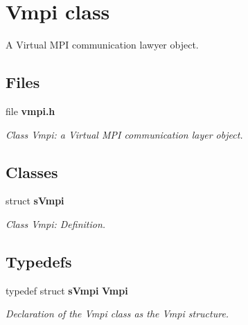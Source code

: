 \section{Vmpi class}
\label{a00026}


A Virtual M\+P\+I communication lawyer object.  


\subsection*{Files}
\begin{DoxyCompactItemize}
\item 
file {\bf vmpi.\+h}
\begin{DoxyCompactList}\small\item\em Class Vmpi\+: a Virtual M\+P\+I communication layer object. \end{DoxyCompactList}\end{DoxyCompactItemize}
\subsection*{Classes}
\begin{DoxyCompactItemize}
\item 
struct {\bf s\+Vmpi}
\begin{DoxyCompactList}\small\item\em Class Vmpi\+: Definition. \end{DoxyCompactList}\end{DoxyCompactItemize}
\subsection*{Typedefs}
\begin{DoxyCompactItemize}
\item 
typedef struct {\bf s\+Vmpi} {\bf Vmpi}
\begin{DoxyCompactList}\small\item\em Declaration of the Vmpi class as the Vmpi structure. \end{DoxyCompactList}\end{DoxyCompactItemize}
